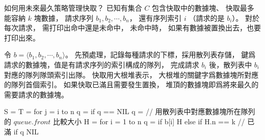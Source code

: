 \startEXERCISE
如何用未來最久策略管理快取？
已知有集合 $C$ 包含快取中的數據塊、
快取最多能容納 $k$ 塊數據，
請求序列 $b_1,b_2,\cdots,b_n$，
還有序列索引 $i$ （請求的是 $b_i$）。
對於每次請求，
需打印出命中還是未命中，
未命中時，
如果有數據被置換出去，也要打印出來。
\stopEXERCISE

\startANSWER
令 $b=\langle b_1,b_2,\cdots,b_n\rangle$。
先預處理，記錄每種請求的下標，採用散列表存儲，
鍵爲請求的數據塊，值是有請求序列的索引構成的隊列，
完成請求 $b_i$ 後，散列表中 $b_i$ 對應的隊列隊頭索引出隊。
快取用大根堆表示，
大根堆的關鍵字爲數據塊所對應的隊列首個索引。
如果快取已滿且需要發生置換，
堆頂的數據塊即爲將來最久的需要請求的數據塊。

\startCLRSCODE
S = 
T = 
for j = i to n
	q = 
	if q == NIL
		q = 
// 用散列表中對應數據塊所在隊列的 $queue.front$ 比較大小
H = 
for i = 1 to n
	q = 
	if b[i] \in H
	else
		if H.n == k	// 已滿
	if q \ne NIL
\stopCLRSCODE
\stopANSWER

